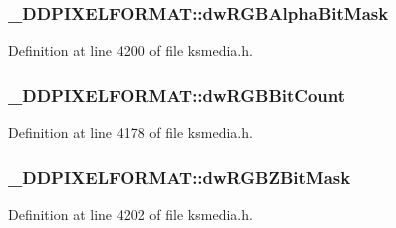 \subsubsection[{\texorpdfstring{dw\+R\+G\+B\+Alpha\+Bit\+Mask}{dwRGBAlphaBitMask}}]{ \+\_\+\+D\+D\+P\+I\+X\+E\+L\+F\+O\+R\+M\+A\+T\+::dw\+R\+G\+B\+Alpha\+Bit\+Mask}\hypertarget{struct___d_d_p_i_x_e_l_f_o_r_m_a_t_ade3716ef319e04757c69ed6749b3db18}{}\label{struct___d_d_p_i_x_e_l_f_o_r_m_a_t_ade3716ef319e04757c69ed6749b3db18}


Definition at line 4200 of file ksmedia.\+h.

\subsubsection[{\texorpdfstring{dw\+R\+G\+B\+Bit\+Count}{dwRGBBitCount}}]{ \+\_\+\+D\+D\+P\+I\+X\+E\+L\+F\+O\+R\+M\+A\+T\+::dw\+R\+G\+B\+Bit\+Count}\hypertarget{struct___d_d_p_i_x_e_l_f_o_r_m_a_t_aba8e4113c7ca8979b8de8fa7a26ede64}{}\label{struct___d_d_p_i_x_e_l_f_o_r_m_a_t_aba8e4113c7ca8979b8de8fa7a26ede64}


Definition at line 4178 of file ksmedia.\+h.

\subsubsection[{\texorpdfstring{dw\+R\+G\+B\+Z\+Bit\+Mask}{dwRGBZBitMask}}]{ \+\_\+\+D\+D\+P\+I\+X\+E\+L\+F\+O\+R\+M\+A\+T\+::dw\+R\+G\+B\+Z\+Bit\+Mask}\hypertarget{struct___d_d_p_i_x_e_l_f_o_r_m_a_t_a0a46dd1f063b165dc2fdb5478f991fa7}{}\label{struct___d_d_p_i_x_e_l_f_o_r_m_a_t_a0a46dd1f063b165dc2fdb5478f991fa7}


Definition at line 4202 of file ksmedia.\+h.

